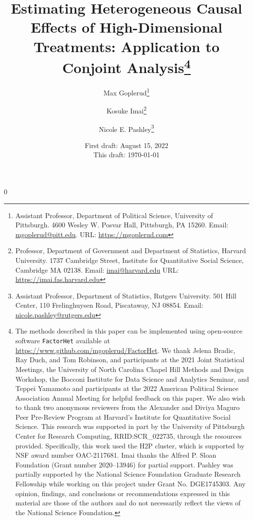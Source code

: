 \documentclass[11pt]{article}
\newcommand\spacingset[1]{\renewcommand{\baselinestretch}%
  {#1}\small\normalsize}
\newcommand{\blind}{0}
\begin{document}
 

\newcommand{\tit}{Estimating Heterogeneous Causal Effects of
  High-Dimensional Treatments: Application to Conjoint Analysis}
%
%


\spacingset{1.1}

\blind

{\title{{\bf \tit}\thanks{The methods described in this paper can be
      implemented using open-source software \texttt{FactorHet}
      available at
      \url{https://www.github.com/mgoplerud/FactorHet}. We thank
      Jelena Bradic, Ray Duch, and Tom Robinson, and participants at the 2021 Joint Statistical Meetings, the University of North Carolina Chapel Hill Methods and Design Workshop, the Bocconi Institute for Data Science and Analytics Seminar, and Teppei Yamamoto and participants at the 2022 American Political Science Association Annual Meeting for helpful feedback on this paper. We also wish to thank two anonymous reviewers from the Alexander and Diviya Maguro Peer Pre-Review Program at Harvard's Institute for Quantitative Social Science. This research was supported in part by the University of Pittsburgh Center for Research Computing, RRID:SCR\_022735, through the resources provided. Specifically, this work used the H2P cluster, which is supported by NSF award number OAC-2117681. Imai thanks the Alfred P. Sloan Foundation (Grant number 2020--13946) for partial support. Pashley was partially supported by the National Science Foundation Graduate Research Fellowship while working on this project under Grant No. DGE1745303. Any opinion, findings, and conclusions or recommendations expressed in this material are those of the authors and do not necessarily reflect the views of the National Science Foundation.}}

  \author{Max Goplerud\thanks{Assistant Professor, Department of Political Science, University of Pittsburgh. 4600 Wesley W. Posvar Hall, Pittsburgh, PA 15260. Email: \href{mailto:mgoplerud@pitt.edu}{mgoplerud@pitt.edu}. URL: \href{https://www.mgoplerud.com}{https://mgoplerud.com}}
    \and
    Kosuke
    Imai\thanks{Professor, Department of Government and Department of
      Statistics, Harvard University.  1737 Cambridge Street,
      Institute for Quantitative Social Science, Cambridge MA 02138.
      Email: \href{mailto:imai@harvard.edu}{imai@harvard.edu} URL:
      \href{https://imai.fas.harvard.edu}{https://imai.fas.harvard.edu}}
    \and Nicole E. Pashley\thanks{Assistant Professor, Department of Statistics, Rutgers University.  501 Hill Center, 
    110 Frelinghuysen Road, Piscataway, NJ 08854.
      Email: \href{mailto:nicole.pashley@rutgers.edu}{nicole.pashley@rutgers.edu}}}


  \date{
       First draft: August 15, 2022 \\
    This draft: \today
}

\maketitle

}\fi
\end{document}
